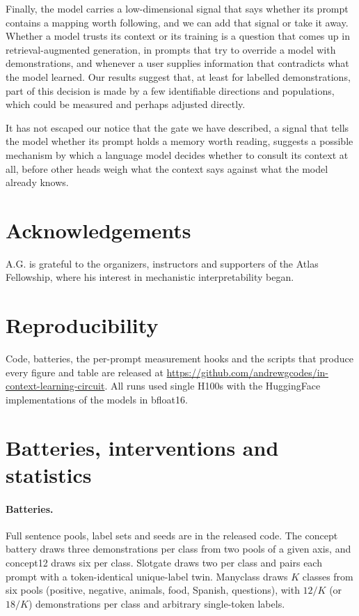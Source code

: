 \documentclass{article}
\begin{document}
Finally, the model carries a low-dimensional signal that says whether its prompt contains a mapping worth following, and we can add that signal or take it away. Whether a model trusts its context or its training is a question that comes up in retrieval-augmented generation, in prompts that try to override a model with demonstrations, and whenever a user supplies information that contradicts what the model learned. Our results suggest that, at least for labelled demonstrations, part of this decision is made by a few identifiable directions and populations, which could be measured and perhaps adjusted directly.

It has not escaped our notice that the gate we have described, a signal that tells the model whether its prompt holds a memory worth reading, suggests a possible mechanism by which a language model decides whether to consult its context at all, before other heads weigh what the context says against what the model already knows.

\section*{Acknowledgements}
A.G. is grateful to the organizers, instructors and supporters of the Atlas Fellowship, where his interest in mechanistic interpretability began.

\section*{Reproducibility}
Code, batteries, the per-prompt measurement hooks and the scripts that produce every figure and table are released at \url{https://github.com/andrewgcodes/in-context-learning-circuit}. All runs used single H100s with the HuggingFace implementations of the models in bfloat16.

\raggedbottom



\appendix
\section{Batteries, interventions and statistics}\label{app:setup}
\paragraph{Batteries.} Full sentence pools, label sets and seeds are in the released code. The concept battery draws three demonstrations per class from two pools of a given axis, and concept12 draws six per class. Slotgate draws two per class and pairs each prompt with a token-identical unique-label twin. Manyclass draws $K$ classes from six pools (positive, negative, animals, food, Spanish, questions), with $12/K$ (or $18/K$) demonstrations per class and arbitrary single-token labels.
\end{document}
